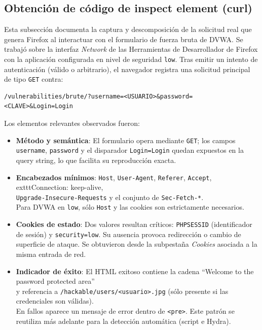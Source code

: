\documentclass[letterpaper,12pt]{article}
\let\origsubsection\subsection
\renewcommand{\subsection}{\FloatBarrier\origsubsection}
\begin{document}
\subsection{Obtención de código de inspect element (curl)}
Esta subsección documenta la captura y descomposición de la solicitud real que genera Firefox al interactuar con el formulario de fuerza bruta de DVWA. Se trabajó sobre la interfaz \emph{Network} de las Herramientas de Desarrollador de Firefox con la aplicación configurada en nivel de seguridad \texttt{low}. Tras emitir un intento de autenticación (válido o arbitrario), el navegador registra una solicitud principal de tipo \texttt{GET} contra:
\begin{verbatim}
/vulnerabilities/brute/?username=<USUARIO>&password=<CLAVE>&Login=Login
\end{verbatim}
Los elementos relevantes observados fueron:
\begin{itemize}
        \item \textbf{Método y semántica}: El formulario opera mediante \texttt{GET}; los campos \texttt{username}, \texttt{password} y el disparador \texttt{Login=Login} quedan expuestos en la query string, lo que facilita su reproducción exacta.
    \item \textbf{Encabezados mínimos}: \texttt{Host}, \texttt{User-Agent}, \texttt{Referer}, \texttt{Accept}, \\
    	exttt{Connection: keep-alive}, \\ \texttt{Upgrade-Insecure-Requests} y el conjunto de \texttt{Sec-Fetch-*}. \\
    Para DVWA en \texttt{low}, sólo \texttt{Host} y las cookies son estrictamente necesarios.
        \item \textbf{Cookies de estado}: Dos valores resultan críticos: \texttt{PHPSESSID} (identificador de sesión) y \texttt{security=low}. Su ausencia provoca redirección o cambio de superficie de ataque. Se obtuvieron desde la subpestaña \emph{Cookies} asociada a la misma entrada de red.
    \item \textbf{Indicador de éxito}: El HTML exitoso contiene la cadena ``Welcome to the password protected area'' \\
    y referencia a \texttt{/hackable/users/\allowbreak<usuario>.jpg} (sólo presente si las credenciales son válidas). \\
    En fallos aparece un mensaje de error dentro de \texttt{<pre>}. Este patrón se reutiliza más adelante para la detección automática (script e Hydra).
\end{itemize}
\end{document}
